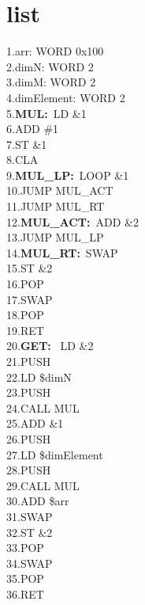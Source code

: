 \documentclass{article}
\begin{document}
\section{list}
\tiny

\begin{minipage}{.18\textwidth}
1.arr: WORD 0x100\\
2.dimN: WORD 2\\
3.dimM: WORD 2\\
4.dimElement: WORD 2\\
5.\textbf{MUL:}\ LD \&1\\
        6.ADD \#1\\
        7.ST \&1\\
        8.CLA\\
9.\textbf{MUL\_LP:}\ LOOP \&1\\
        10.JUMP MUL\_ACT\\
        11.JUMP MUL\_RT\\
12.\textbf{MUL\_ACT:}\ ADD \&2\\
        13.JUMP MUL\_LP\\
14.\textbf{MUL\_RT:}\ SWAP\\
        15.ST \&2\\
        16.POP\\
        17.SWAP\\
        18.POP\\
        19.RET\\
20.\textbf{GET:} \ LD \&2\\
        21.PUSH\\
        22.LD \$dimN\\
        23.PUSH\\
        24.CALL MUL\\
        25.ADD \&1\\
        26.PUSH\\
        27.LD \$dimElement\\
        28.PUSH\\
        29.CALL MUL\\
        30.ADD \$arr\\
        31.SWAP\\
        32.ST \&2\\
        33.POP\\
        34.SWAP\\
        35.POP\\
       36.RET\\
\end{minipage}
\end{document}
